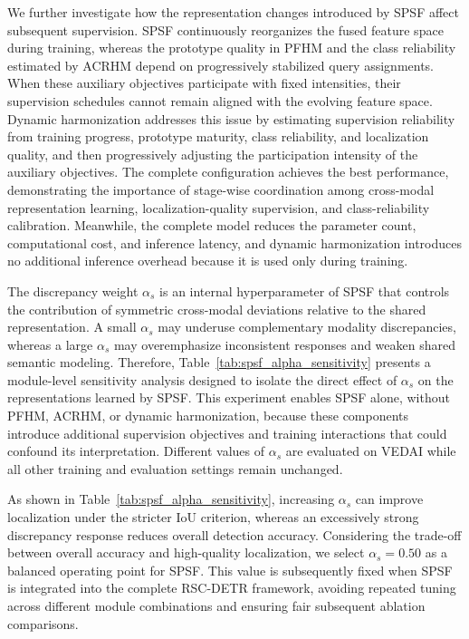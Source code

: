 \documentclass[letterpaper,journal]{IEEEtran}
\begin{document}
We further investigate how the representation changes introduced by SPSF affect subsequent supervision. SPSF continuously reorganizes the fused feature space during training, whereas the prototype quality in PFHM and the class reliability estimated by ACRHM depend on progressively stabilized query assignments. When these auxiliary objectives participate with fixed intensities, their supervision schedules cannot remain aligned with the evolving feature space. Dynamic harmonization addresses this issue by estimating supervision reliability from training progress, prototype maturity, class reliability, and localization quality, and then progressively adjusting the participation intensity of the auxiliary objectives. The complete configuration achieves the best performance, demonstrating the importance of stage-wise coordination among cross-modal representation learning, localization-quality supervision, and class-reliability calibration. Meanwhile, the complete model reduces the parameter count, computational cost, and inference latency, and dynamic harmonization introduces no additional inference overhead because it is used only during training.

The discrepancy weight $\alpha_s$ is an internal hyperparameter of SPSF that controls the contribution of symmetric cross-modal deviations relative to the shared representation. A small $\alpha_s$ may underuse complementary modality discrepancies, whereas a large $\alpha_s$ may overemphasize inconsistent responses and weaken shared semantic modeling. Therefore, Table~\ref{tab:spsf_alpha_sensitivity} presents a module-level sensitivity analysis designed to isolate the direct effect of $\alpha_s$ on the representations learned by SPSF. This experiment enables SPSF alone, without PFHM, ACRHM, or dynamic harmonization, because these components introduce additional supervision objectives and training interactions that could confound its interpretation. Different values of $\alpha_s$ are evaluated on VEDAI while all other training and evaluation settings remain unchanged.

As shown in Table~\ref{tab:spsf_alpha_sensitivity}, increasing $\alpha_s$ can improve localization under the stricter IoU criterion, whereas an excessively strong discrepancy response reduces overall detection accuracy. Considering the trade-off between overall accuracy and high-quality localization, we select $\alpha_s=0.50$ as a balanced operating point for SPSF. This value is subsequently fixed when SPSF is integrated into the complete RSC-DETR framework, avoiding repeated tuning across different module combinations and ensuring fair subsequent ablation comparisons.
\end{document}
